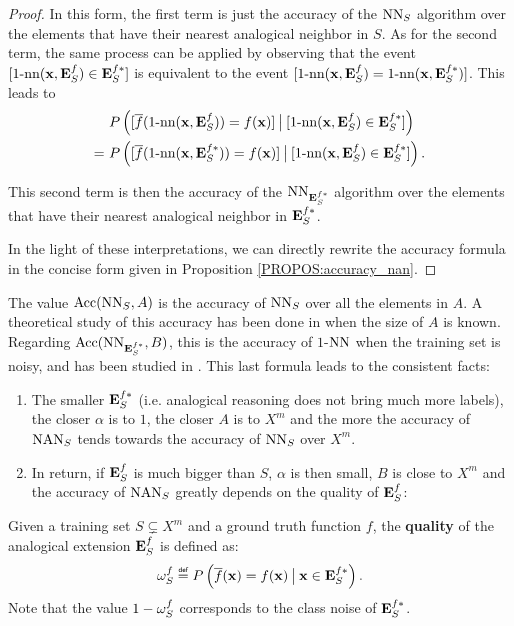 \begin{proof}
In this form, the first term is just the accuracy of the $\NN_S$ algorithm over
the elements that have their nearest analogical neighbor in $S$.
As for the second term, the same process can be applied by observing that the
event $[\nn(\mathbf{x}, \esf) \in\esfs]$ is equivalent to the event
$[\nn(\mathbf{x}, \esf) = \nn(\mathbf{x}, \esfs)]$. This leads to
\begin{align*}
  &P\left([\albl{\nn(\mathbf{x}, \esf)} = f(\mathbf{x})] \given[\big]
  [\nn(\mathbf{x}, \esf) \in \esfs]\right)\\
  =~ &P\left([\albl{\nn(\mathbf{x}, \esfs)} = f(\mathbf{x})] \given[\big]
  [\nn(\mathbf{x}, \esf) \in \esfs]\right).
\end{align*}

This second term is then the accuracy of the $\NN_{\esfs}$ algorithm over the
elements that have their nearest analogical neighbor in $\esfs$.

In the light of these interpretations, we can directly rewrite the accuracy
formula in the concise form given in Proposition \ref{PROPOS:accuracy_nan}.
\end{proof}

The value $\acc(\NN_S, A)$ is the accuracy of $\NN_S$ over all the elements in
$A$. A theoretical study of this accuracy has been done in \cite{LanIbaIJCAI93}
when the size of $A$ is known.  Regarding $\acc(\NN_{\esfs}, B)$, this is the
accuracy of $1$-$\NN$ when the training set is
noisy, and has been studied in \cite{OkaYugIJCAI97}. This last formula leads
to the consistent facts:
\begin{enumerate}
\item The smaller $\esfs$ (i.e. analogical reasoning does not
  bring much more labels), the closer $\alpha$ is to $1$, the closer $A$ is to
  $X^m$ and the more the accuracy of $\NAN_S$ tends towards the accuracy of
  $\NN_S$ over $X^m$.
\item In return, if $\esf$ is much bigger than $S$, $\alpha$ is then small, $B$
  is close to $X^m$ and the accuracy of $\NAN_S$ greatly depends on the quality
  of $\esf$:  \end{enumerate}

\begin{definition}
  \label{DEF:omega}
  Given a training set $S\subsetneq X^m$ and a ground truth function $f$, the
  \textbf{quality} of the analogical extension $\esf$ is defined as:
  $$
  \omegasf \eqdef P\left(\albl{\mathbf{x}} = f(\mathbf{x}) \given[\big]
  \mathbf{x} \in \esfs\right).$$
  Note that the value $1 - \omegasf$ corresponds to the class noise of $\esfs$.
\end{definition}

